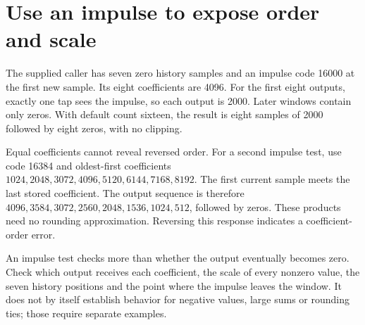 \section{Use an impulse to expose order and scale}
The supplied caller has seven zero history samples and an impulse code 16000 at the
first new sample. Its eight coefficients are 4096. For the first eight outputs,
exactly one tap sees the impulse, so each output is 2000. Later windows contain only
zeros. With default count sixteen, the result is eight samples of 2000 followed by
eight zeros, with no clipping.

Equal coefficients cannot reveal reversed order. For a second impulse test, use
code 16384 and oldest-first coefficients
\(1024,2048,3072,4096,5120,6144,7168,8192\). The first current sample meets the last
stored coefficient. The output sequence is therefore
\(4096,3584,3072,2560,2048,1536,1024,512\), followed by zeros. These products need
no rounding approximation. Reversing this response indicates a coefficient-order error.

An impulse test checks more than whether the output eventually becomes zero. Check
which output receives each coefficient, the scale of every nonzero value, the seven
history positions and the point where the impulse leaves the window. It does not by
itself establish behavior for negative values, large sums or rounding ties; those
require separate examples.
